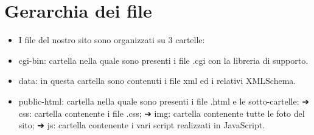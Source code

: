 \documentclass[12pt]{article}
\begin{document}
			\section{Gerarchia dei file}
			\begin{itemize}
				\item I file del nostro sito sono organizzati su 3 cartelle:
				\item cgi-bin: cartella nella quale sono presenti i file .cgi con la libreria di supporto.
				\item data: in questa cartella sono contenuti i file xml ed i relativi XMLSchema.
				\item public-html: cartella nella quale sono presenti i file .html e le sotto-cartelle:
				➔ css: cartella contenente i file .css;
				➔ img: cartella contenente tutte le foto del sito;
				➔ js: cartella contenente i vari script realizzati in JavaScript.
			\end{itemize}
			
				
		
	
	
\end{document}
